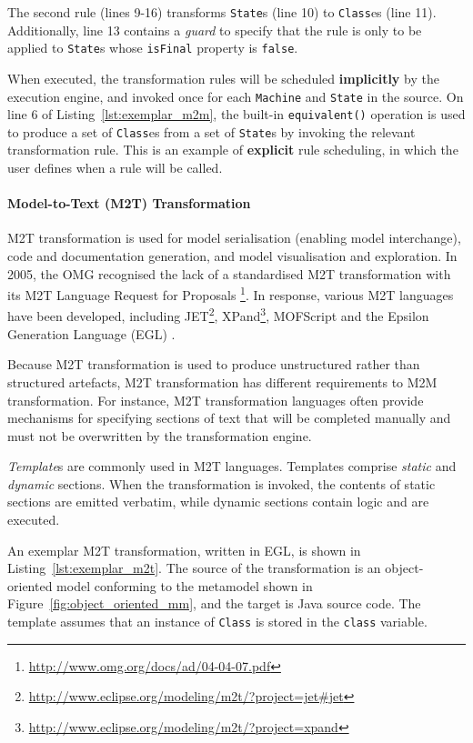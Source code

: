 The second rule (lines 9-16) transforms \texttt{State}s (line 10) to \texttt{Class}es (line 11). Additionally, line 13 contains a \emph{guard} to specify that the rule is only to be applied to \texttt{State}s whose \texttt{isFinal} property is \texttt{false}.

When executed, the transformation rules will be scheduled \textbf{implicitly} by the execution engine, and invoked once for each \texttt{Machine} and \texttt{State} in the source. On line 6 of Listing~\ref{lst:exemplar_m2m}, the built-in \texttt{equivalent()} operation is used to produce a set of \texttt{Class}es from a set of \texttt{State}s by invoking the relevant transformation rule. This is an example of \textbf{explicit} rule scheduling, in which the user defines when a rule will be called.


\paragraph{Model-to-Text (M2T) Transformation} M2T transformation is used for model serialisation (enabling model interchange), code and documentation generation, and model visualisation and exploration.  In 2005, the OMG \cite{omg} recognised the lack of a standardised M2T transformation with its M2T Language Request for Proposals \footnote{\url{http://www.omg.org/docs/ad/04-04-07.pdf}}. In response, various M2T languages have been developed, including JET\footnote{\url{http://www.eclipse.org/modeling/m2t/?project=jet#jet}}, XPand\footnote{\url{http://www.eclipse.org/modeling/m2t/?project=xpand}}, MOFScript \cite{oldevik05toward} and the Epsilon Generation Language (EGL) \cite{rose08egl}.

Because M2T transformation is used to produce unstructured rather than structured artefacts, M2T transformation has different requirements to M2M transformation. For instance, M2T transformation languages often provide mechanisms for specifying sections of text that will be completed manually and must not be overwritten by the transformation engine.

\emph{Template}s are commonly used in M2T languages. Templates comprise \emph{static} and \emph{dynamic} sections. When the transformation is invoked, the contents of static sections are emitted verbatim, while dynamic sections contain logic and are executed.

An exemplar M2T transformation, written in EGL, is shown in Listing~\ref{lst:exemplar_m2t}. The source of the transformation is an object-oriented model conforming to the metamodel shown in Figure~\ref{fig:object_oriented_mm}, and the target is Java source code. The template assumes that an instance of \texttt{Class} is stored in the \texttt{class} variable.

